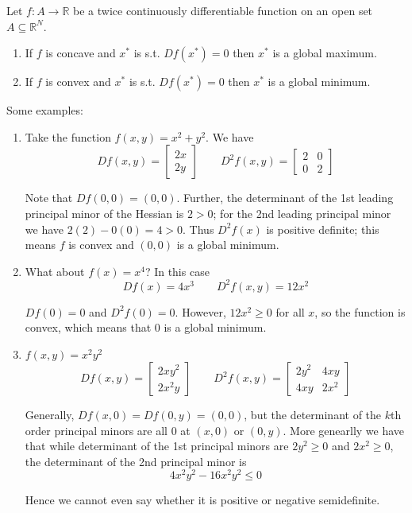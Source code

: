 \documentclass{article}
\begin{document}
\begin{theorem}
  Let $f: A \to \mathbb{R}$ be a twice continuously differentiable function on an open set $A \subseteq \mathbb{R}^N$.
  \begin{enumerate}
    \item If $f$ is concave and $x^*$ is s.t. $Df(x^*) = 0$ then $x^*$ is a global maximum.

    \item If $f$ is convex and $x^*$ is s.t. $Df(x^*) = 0$ then $x^*$ is a global minimum.
  \end{enumerate}
\end{theorem}

Some examples:
\begin{enumerate}
  \item Take the function $f(x, y) = x^2 + y^2$. We have
    \[
      Df(x, y) = \left[\begin{matrix}
      2x \\ 2y
      \end{matrix}\right]
      \quad\quad
      D^2f(x, y) = \left[\begin{matrix}
        2 & 0 \\ 0 & 2
      \end{matrix}\right]
    \]

    Note that $Df(0, 0) = (0, 0)$. Further, the determinant of the 1st leading principal minor of the Hessian is $2 > 0$; for the 2nd leading principal minor we have $2(2) - 0(0) = 4 > 0$. Thus $D^2f(x)$ is positive definite; this means $f$ is convex and $(0, 0)$ is a global minimum.

  \item What about $f(x) = x^4$? In this case
    \[
      Df(x) = 4x^3
      \quad\quad
      D^2f(x, y) = 12x^2
    \]

    $Df(0) = 0$ and $D^2f(0) = 0$. However, $12x^2 \ge 0$ for all $x$, so the function is convex, which means that $0$ is a global minimum.

  \item $f(x, y) = x^2y^2$
    \[
      Df(x, y) = \left[\begin{matrix}
      2xy^2 \\ 2x^2y
      \end{matrix}\right]
      \quad\quad
      D^2f(x, y) = \left[\begin{matrix}
        2y^2 & 4xy \\ 4xy & 2x^2
      \end{matrix}\right]
    \]

    Generally, $Df(x, 0) = Df(0, y) = (0, 0)$, but the determinant of the $k$th order principal minors are all $0$ at $(x, 0)$ or $(0, y)$. More genearlly we have that while determinant of the 1st principal minors are $2y^2 \ge 0$ and $2x^2 \ge 0$, the determinant of the 2nd principal minor is
    \[
        4x^2y^2 - 16x^2y^2 \le 0
    \]

    Hence we cannot even say whether it is positive or negative semidefinite.
\end{enumerate}


\clearpage
\printindex

\end{document}
